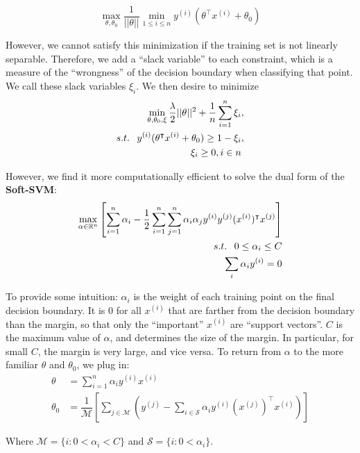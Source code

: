 \documentclass[10pt,letterpaper]{article}
\begin{document}
\begin{equation}
\max_{\theta, \theta_0} \dfrac{1}{||\theta||} \min_{1 \le i \le n} y^{(i)} (\theta^\intercal x^{(i)} + \theta_0)
\end{equation}

However, we cannot satisfy this minimization if the training set is not linearly separable. Therefore, we add a ``slack variable'' to each constraint, which is a measure of the ``wrongness'' of the decision boundary when classifying that point. We call these slack variables $\xi_i$. We then desire to minimize
\begin{align}
\min_{\theta, \theta_0, \xi} \dfrac{\lambda}{2} ||\theta||^2 + \dfrac{1}{n} \sum_{i=1}^{n} \xi_{i} &, \\
s.t. \hspace{.75em} y^{(i)}(\theta^\intercal x^{(i)} + \theta_0) \ge 1 - \xi_i &, \\
\xi_i \ge 0, i \in n &
\end{align}

However, we find it more computationally efficient to solve the dual form of the \textbf{Soft-SVM}:
\begin{align}
\max_{\alpha \in \mathbb{R}^n} \left[ \sum_{i=1}^n \alpha_i - \dfrac{1}{2} \sum_{i=1}^n \sum_{j=1}^n \alpha_i \alpha_j y^{(i)} y^{(j)} (x^{(i)})^\intercal x^{(j)}\right] & \\
s.t. \hspace{.75em} 0 \le \alpha_i \le C & \\
\sum_i \alpha_i y^{(i)} = 0 &
\end{align}

To provide some intuition: $\alpha_i$ is the weight of each training point on the final decision boundary. It is 0 for all $x^{(i)}$ that are farther from the decision boundary than the margin, so that only the ``important'' $x^{(i)}$ are ``support vectors''. $C$ is the maximum value of $\alpha$, and determines the size of the margin. In particular, for small $C$, the margin is very large, and vice versa. To return from $\alpha$ to the more familiar $\theta$ and $\theta_0$, we plug in:
\begin{align}
\theta &= \sum_{i=1}^n \alpha_i y^{(i)} x^{(i)} \\
\theta_0 &= \dfrac{1}{\mathcal{M}} \left[ \sum_{j \in \mathcal{M}} \left( y^{(j)} - \sum_{i \in \mathcal{S}} \alpha_i y^{(i)} (x^{(j)})^\intercal x^{(i)} \right) \right]
\end{align}

Where $\mathcal{M} = \{ i : 0 < \alpha_i < C \}$ and $\mathcal{S} = \{ i : 0 < \alpha_i \}$.
\end{document}
